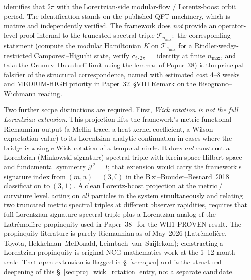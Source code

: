 identifies that $2\pi$ with the Lorentzian-side modular-flow /
Lorentz-boost orbit period.  The identification stands on the
published QFT machinery, which is mature and independently verified.
The framework does \emph{not} provide an operator-level proof
internal to the truncated spectral triple
$\mathcal{T}_{n_{\max}}$:\ the corresponding statement
(compute the modular Hamiltonian $K$ on $\mathcal{T}_{n_{\max}}$
for a Rindler-wedge-restricted Camporesi--Higuchi state, verify
$\sigma_{i\cdot 2\pi} = $ identity at finite $n_{\max}$, and take
the Gromov--Hausdorff limit using the lemmas of Paper~38) is the
principal falsifier of the structural correspondence, named with
estimated cost 4--8 weeks and MEDIUM-HIGH priority in Paper~32~§VIII
Remark on the Bisognano--Wichmann reading.

Two further scope distinctions are required.
First, \emph{Wick rotation is not the full Lorentzian extension.}
This projection lifts the framework's metric-functional Riemannian
output (a Mellin trace, a heat-kernel coefficient, a Wilson
expectation value) to its Lorentzian analytic continuation in
cases where the bridge is a single Wick rotation of a temporal
circle.  It does \emph{not} construct a Lorentzian (Minkowski-signature)
spectral triple with Krein-space Hilbert space and fundamental
symmetry $\mathcal{J}^2 = I$; that extension would carry the
framework's signature index from $(m,n) = (3, 0)$ in the
Bizi--Brouder--Besnard~2018~\cite{bizi_brouder_besnard2018}
classification to $(3, 1)$.  A clean Lorentz-boost projection at
the metric / curvature level, acting on \emph{all} particles in the
system simultaneously and relating two truncated metric spectral
triples at different observer rapidities, requires that full
Lorentzian-signature spectral triple plus a Lorentzian analog of
the Latr\'emoli\`ere propinquity used in Paper~38~\cite{paper38}
for the WH1 PROVEN result.  The propinquity literature is purely
Riemannian as of May~2026 (Latr\'emoli\`ere, Toyota,
Hekkelman--McDonald, Leimbach--van~Suijlekom); constructing a
Lorentzian propinquity is original NCG-mathematics work at the
6--12 month scale.  That open extension is flagged in
\S~\ref{sec:open} and is the structural deepening of this
\S~\ref{sec:proj_wick_rotation} entry, not a separate candidate.

